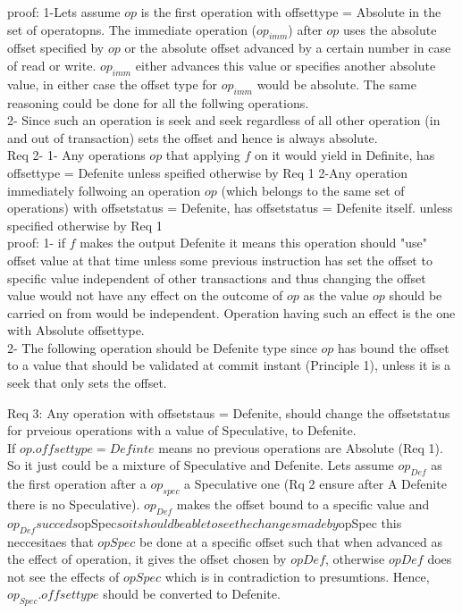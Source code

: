 \documentclass[a4paper, 11pt]{article}
\begin{document}
proof: 1-Lets assume $op$ is the first operation with offsettype = Absolute in the set of operatopns. The immediate operation ($op_{imm}$) after $op$ uses the absolute offset specified by $op$ or the absolute offset advanced by a certain number in case of read or write. $op_{imm}$ either advances this value or specifies another absolute value, in either case the offset type for $op_{imm}$ would be absolute. The same reasoning could be done for all the follwing operations.\\

2- Since such an operation is seek and seek regardless of all other operation (in and out of transaction) sets the offset and hence is always absolute.\\

Req 2- 1- Any operations $op$ that applying $f$ on it would yield in Definite, has offsettype = Defenite unless speified otherwise by Req 1  2-Any operation immediately follwoing an operation $op$ (which belongs to the same set of operations) with offsetstatus = Defenite, has offsetstatus = Defenite itself. unless specified otherwise by Req 1\\

proof: 1- if $f$ makes the output Defenite it means this operation should "use" offset value at that time unless some previous instruction has set the offset to specific value independent of other transactions and thus changing the offset value would not have any effect on the outcome of $op$ as the value $op$ should be carried on from would be independent. Operation having such an effect is the one with Absolute offsettype.\\

2- The following operation should be Defenite type since $op$ has bound the offset to a value that should be validated at commit instant (Principle 1), unless it is a seek that only sets the offset. 

Req 3: Any operation with offsetstaus = Defenite, should change the offsetstatus for prveious operations with a value of Speculative, to Defenite.\\

If $op.offsettype = Definte$ means no previous operations are Absolute (Req 1). So it just could be a mixture of Speculative and Defenite. Lets assume $op_{Def}$ as the first operation after a $op_{spec}$ a Speculative one (Rq 2 ensure after A Defenite there is no Speculative).  $op_{Def}$ makes the offset bound to a specific value and $op_{Def} succeds $op{Spec}$ so it should be able to see the changes made by $op{Spec} this neccesitaes that $op{Spec}$ be done at a specific offset such that when advanced as the effect of operation, it gives the offset chosen by $op{Def}$, otherwise $op{Def}$ does not see the effects of $op{Spec}$ which is in contradiction to presumtions. Hence, $op_{Spec}.offsettype$ should be converted to Defenite.\\
\end{document}
